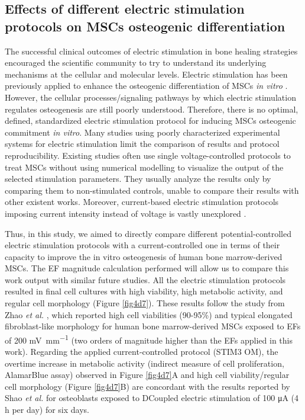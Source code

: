 \subsection{Effects of different electric stimulation protocols on \ac{MSCs} osteogenic differentiation}
The successful clinical outcomes of electric stimulation in bone healing strategies encouraged the scientific community to try to understand its underlying mechanisms at the cellular and molecular levels. Electric stimulation has been previously applied to enhance the osteogenic differentiation of \ac{MSCs} \textit{in vitro} \cite{Guillot-Ferriols2022-wn, Peng2023-ud, Bianconi2023-rs}. However, the cellular processes/signaling pathways by which electric stimulation regulates osteogenesis are still poorly understood. Therefore, there is no optimal, defined, standardized electric stimulation protocol for inducing \ac{MSCs} osteogenic commitment \textit{in vitro}. Many studies using poorly characterized experimental systems for electric stimulation limit the comparison of results and protocol reproducibility. Existing studies often use single voltage-controlled protocols to treat \ac{MSCs} without using numerical modelling to visualize the output of the selected stimulation parameters. They usually analyze the results only by comparing them to non-stimulated controls, unable to compare their results with other existent works. Moreover, current-based electric stimulation protocols imposing current intensity instead of voltage is vastly unexplored \cite{Guette-Marquet2021-rp}.

Thus, in this study, we aimed to directly compare different potential-controlled electric stimulation protocols with a current-controlled one in terms of their capacity to improve the in vitro osteogenesis of human bone marrow-derived \ac{MSCs}. The \ac{EF} magnitude calculation performed will allow us to compare this work output with similar future studies. All the electric stimulation protocols resulted in final cell cultures with high viability, high metabolic activity, and regular cell morphology (Figure \ref{fig4d7}). These results follow the study from Zhao \textit{et al.} \cite{Zhao2011-wy}, which reported high cell viabilities (90-95\%) and typical elongated fibroblast-like morphology for human bone marrow-derived \ac{MSCs} exposed to \ac{EFs} of 200 \si{\milli\volt\per\milli\meter} (two orders of magnitude higher than the \ac{EFs} applied in this work). Regarding the applied current-controlled protocol (STIM3 OM), the overtime increase in metabolic activity (indirect measure of cell proliferation, AlamarBlue assay) observed in Figure \ref{fig4d7}A and high cell viability/regular cell morphology (Figure \ref{fig4d7}B) are concordant with the results reported by Shao \textit{et al.} \cite{Shao2011-dz} for osteoblasts exposed to DCoupled electric stimulation of 100 \si{\micro\ampere} (4 \si{\hour} per day) for six days.

